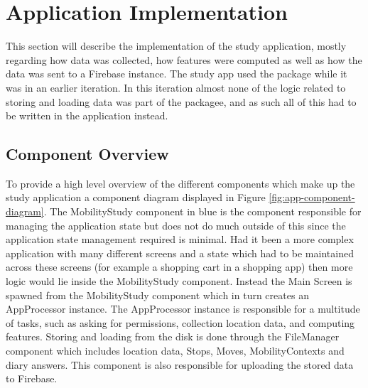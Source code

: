 \section{Application Implementation}
This section will describe the implementation of the study application, mostly regarding how data was collected, how features were computed as well as how the data was sent to a Firebase instance. The study app used the package while it was in an earlier iteration. In this iteration almost none of the logic related to storing and loading data was part of the packagee, and as such all of this had to be written in the application instead.

\subsection{Component Overview}
To provide a high level overview of the different components which make up the study application a component diagram displayed in Figure \ref{fig:app-component-diagram}. The MobilityStudy component in blue is the component responsible for managing the application state but does not do much outside of this since the application state management required is minimal. Had it been a more complex application with many different screens and a state which had to be maintained across these screens (for example a shopping cart in a shopping app) then more logic would lie inside the MobilityStudy component. Instead the Main Screen is spawned from the MobilityStudy component which in turn creates an AppProcessor instance. The AppProcessor instance is responsible for a multitude of tasks, such as asking for permissions, collection location data, and computing features. Storing and loading from the disk is done through the FileManager component which includes location data, Stops, Moves, MobilityContexts and diary answers. This component is also responsible for uploading the stored data to Firebase.

